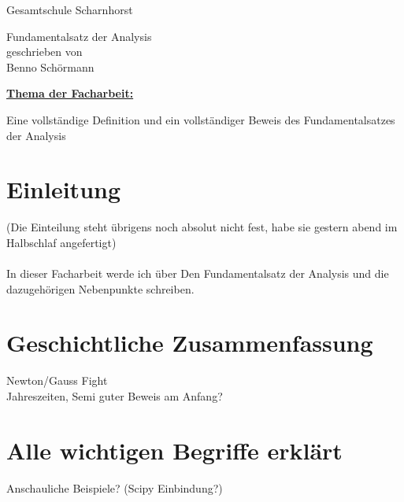 \documentclass[fontsize=12pt,paper=a4,DIV12,cleardoublepage=empty, 
liststotoc,idxtotoc,bibtotoc]{article}
\theoremstyle{plain}
\theoremstyle{definition}
\begin{document}
	\begin{titlepage}
		\vspace*{-3cm}
		\noindent
		\hspace*{1cm}
			\begin{center}
				\centering
				{\LARGE Gesamtschule Scharnhorst}
			\end{center}
		\begin{center}
		\Large{Fundamentalsatz der Analysis}\\[0.5cm]
		\normalsize{geschrieben von}\\[0.25cm]	
		\large{Benno Schörmann}\\[0.5cm]
		\end{center}
	\begin{flushleft}
	\hyperref[subsec:thema1]{\textbf{\large Thema der Facharbeit:}}  \\
	\end{flushleft}
	Eine vollständige Definition und ein vollständiger Beweis des Fundamentalsatzes der Analysis
	\quad \\[1.5cm]
	\noindent 
	\renewcommand{\arraystretch}{1.4}
	\end{titlepage}
	\newpage
	\thispagestyle{empty}
	\tableofcontents
	\newpage
	\section{Einleitung}
	(Die Einteilung steht übrigens noch absolut nicht fest, habe sie gestern abend im Halbschlaf angefertigt) \\\\
	In dieser Facharbeit werde ich über Den Fundamentalsatz der Analysis und die dazugehörigen Nebenpunkte schreiben.
	
	
	
	\section{Geschichtliche Zusammenfassung}
	Newton/Gauss Fight\\
	Jahreszeiten, Semi guter Beweis am Anfang?\\
	
	
	

	\section{Alle wichtigen Begriffe erklärt}
	Anschauliche Beispiele? (Scipy Einbindung?)
	
\end{document}
